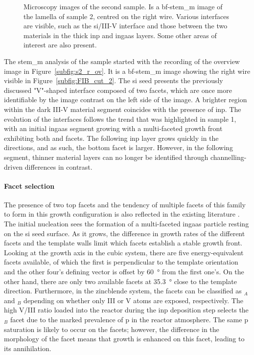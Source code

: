 \begin{figure}
{\begin{tikzpicture}
        \end{tikzpicture}
    }
    \caption{Microscopy images of the second sample.  Is a \acs{bf}-\acs{stem_m} image of the lamella of sample 2, centred on the right wire. Various interfaces are visible, such as the \acs{si}/III-V interface and those between the two materials in the thick \acs{inp} and \acs{ingaas} layers. Some other areas of interest are also present.}
    \label{fig:sample2_stem}
\end{figure}

The \acs{stem_m} analysis of the sample started with the recording of the overview image in Figure~\ref{subfig:s2_r_ov}. It is a \acs{bf}-\acs{stem_m} image showing the right wire visible in Figure~\ref{subfig:FIB_cut_2}. The \acs{si} seed presents the previously discussed "V"-shaped interface composed of two  facets, which are once more identifiable by the image contrast on the left side of the image. A brighter region within the dark III-V material segment coincides with the presence of \acs{inp}. The evolution of the interfaces follows the trend that was highlighted in sample 1, with an initial \acs{ingaas} segment growing with a multi-faceted growth front exhibiting both  and  facets. The following \acs{inp} layer grows quickly in the  directions, and as such, the bottom  facet is larger. However, in the following segment, thinner material layers can no longer be identified through channelling-driven differences in contrast.
\par
\paragraph{Facet selection} The presence of two top  facets and the tendency of multiple facets of this family to form in this growth configuration is also reflected in the existing literature \cite{Borg2014, Schmid2015, Borg2015, Knoedler2017}. The initial nucleation sees the formation of a multi-faceted \acs{ingaas} particle resting on the \acs{si} seed surface. As it grows, the difference in growth rates of the different facets and the template walls limit which facets establish a stable growth front. Looking at the \hkl[1 1 0] growth axis in the cubic system, there are five energy-equivalent  facets available, of which the first is perpendicular to the template orientation and the other four's defining vector is offset by \qty{60}{\degree} from the first one's. On the other hand, there are only two available  facets at \qty{35.3}{\degree} close to the template direction. Furthermore, in the zincblende system, the  facets can be classified as \(_A\) and \(_B\) depending on whether only III or V atoms are exposed, respectively. The high V/III ratio loaded into the reactor during the \acs{inp} deposition step selects the \(_B\) facet due to the marked prevalence of \acl{p} in the reactor atmosphere. The same \acl{p} saturation is likely to occur on the  facets; however, the difference in the morphology of the facet means that growth is enhanced on this facet, leading to its annihilation.

